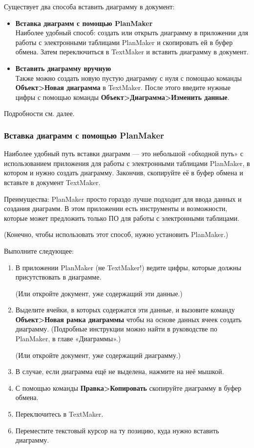 ﻿\documentclass[a4paper,10pt]{article}
\begin{document}
Существует два способа вставить диаграмму в документ:

\begin{itemize}
 \item \textbf{Вставка диаграмм с помощью PlanMaker}\\
 Наиболее удобный способ: создать или открыть диаграмму в приложении для работы с электронными таблицами PlanMaker и скопировать ей в буфер обмена. Затем переключиться в TextMaker и вставить диаграмму в документ.
 \item \textbf{Вставить диаграмму вручную}\\
 Также можно создать новую пустую диаграмму с нуля с помощью команды \textbf{Объект>Новая диаграмма} в TextMaker. После этого введите нужные цифры с помощью команды \textbf{Объект>Диаграмма>Изменить данные}.
\end{itemize}

Подробности см. далее.

\subsubsection{Вставка диаграмм с помощью PlanMaker}
Наиболее удобный путь вставки диаграмм — это небольшой «обходной путь» с использованием приложения для работы с электронными таблицами PlanMaker, в котором и нужно создать диаграмму. Закончив, скопируйте её в буфер обмена и вставьте в документ TextMaker.

Преимущества: PlanMaker просто гораздо лучше подходит для ввода данных и создания диаграмм. В этом приложении есть инструменты и возможности, которые может предложить только ПО для работы с электронными таблицами.

(Конечно, чтобы использовать этот способ, нужно установить PlanMaker.)

Выполните следующее:
\begin{enumerate}
 \item В приложении PlanMaker (не TextMaker!) ведите цифры, которые должны присутствовать в диаграмме.
 
 (Или откройте документ, уже содержащий эти данные.)
 \item Выделите ячейки, в которых содержатся эти данные, и вызовите команду \textbf{Объект>Новая рамка диаграммы} чтобы на основе данных ячеек создать диаграмму. (Подробные инструкции можно найти в руководстве по PlanMaker, в главе «Диаграммы».)
 
 (Или откройте документ, уже содержащий диаграмму.)
 \item В случае, если диаграмма ещё не выделена, нажмите на неё мышкой.
 \item С помощью команды \textbf{Правка>Копировать} скопируйте диаграмму в буфер обмена.
 \item Переключитесь в TextMaker.
 \item Переместите текстовый курсор на ту позицию, куда нужно вставить диаграмму.
\end{enumerate}
\end{document}
